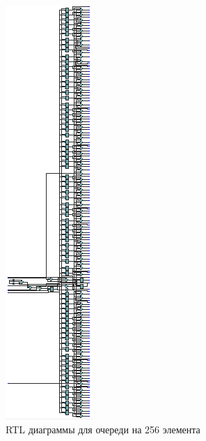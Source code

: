 \documentclass[a4paper,14pt]{article}
\begin{document}
		\begin{figure}[H]
			\centering
			\includegraphics[width=0.5\linewidth]{images/z6_rtl_256_v1}
			\caption{RTL диаграммы для очереди на 256 элемента}
			\label{fig:z6_rtl_256_v1}
		\end{figure}
	
\end{document}
